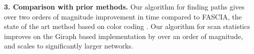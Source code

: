 \noindent
\textbf{3. Comparison with prior methods.}
Our algorithm for finding paths gives over two orders of magnitude improvement in time
compared to FASCIA, the state of the art method based on color coding \cite{slota:icpp13, slota:ipdps14}.
Our algorithm for scan statistics improves on the Giraph based implementation
\cite{cadena:bigdata17} by over an order of magnitude, and scales to significantly larger networks.




